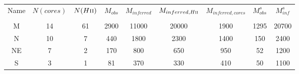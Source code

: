 \begin{table*}[htp]
\begin{tabular}{ccccccccc}
\label{tab:clustermassestimates}
Name & $N(cores)$ & $N(H\textsc{ii})$ & $M_{obs}$ & $M_{inferred}$ & $M_{inferred, H\textsc{ii}}$ & $M_{inferred, cores}$ & $M_{obs}^s$ & $M_{inf}^s$ \\
 &  &  &  &  &  &  &  &  \\
\hline
M & 14 & 61 & 2900 & 11000 & 20000 & 1900 & 1295 & 20700 \\
N & 10 & 7 & 440 & 1800 & 2300 & 1400 & 150 & 2400 \\
NE & 7 & 2 & 170 & 800 & 650 & 950 & 52 & 1200 \\
S & 3 & 1 & 81 & 370 & 330 & 410 & 50 & 1100 \\
\hline
\end{tabular}
\end{table*}
